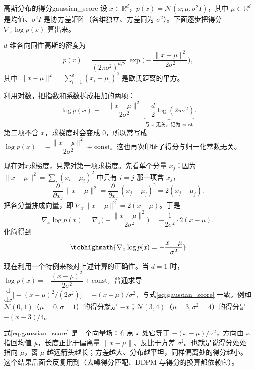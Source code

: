 \begin{example}{高斯分布的得分}{gaussian_score}
设 $x\in\mathbb{R}^d$，$p(x) = \mathcal{N}(x; \mu, \sigma^2 I)$，其中 $\mu\in\mathbb{R}^d$ 是均值、$\sigma^2 I$ 是协方差矩阵（各维独立、方差同为 $\sigma^2$）。下面逐步把得分 $\nabla_x\log p(x)$ 算出来。

$d$ 维各向同性高斯的密度为
\begin{equation}
p(x) = \frac{1}{(2\pi\sigma^2)^{d/2}}\,\exp\!\Big(-\frac{\|x-\mu\|^2}{2\sigma^2}\Big),
\end{equation}
其中 $\|x-\mu\|^2 = \sum_{i=1}^d (x_i-\mu_i)^2$ 是欧氏距离的平方。

利用对数，把指数和系数拆成相加的两项：
\begin{equation}
\log p(x) = -\frac{\|x-\mu\|^2}{2\sigma^2} \;\underbrace{-\;\frac{d}{2}\log(2\pi\sigma^2)}_{\text{与 }x\text{ 无关，记为 const}}.
\end{equation}
第二项不含 $x$，求梯度时会变成 $0$，所以常写成 $\log p(x) = -\dfrac{\|x-\mu\|^2}{2\sigma^2} + \text{const}$。这也再次印证了得分与归一化常数无关。

现在对$x$求梯度，只需对第一项求梯度。先看单个分量 $x_j$：因为 $\|x-\mu\|^2=\sum_i (x_i-\mu_i)^2$ 中只有 $i=j$ 那一项含 $x_j$，
\begin{equation}
\frac{\partial}{\partial x_j}\,\|x-\mu\|^2 = \frac{\partial}{\partial x_j}\,(x_j-\mu_j)^2 = 2(x_j-\mu_j).
\end{equation}
把各分量拼成向量，即 $\nabla_x\|x-\mu\|^2 = 2(x-\mu)$。于是
\begin{equation}
\nabla_x\log p(x) = \nabla_x\Big(-\frac{\|x-\mu\|^2}{2\sigma^2}\Big) = -\frac{1}{2\sigma^2}\cdot 2(x-\mu),
\end{equation}
化简得到
\begin{equation}\label{eq:gaussian_score}
\tcbhighmath{\nabla_x \log p(x) = -\frac{x - \mu}{\sigma^2}}
\end{equation}

现在利用一个特例来核对上述计算的正确性。当 $d=1$ 时，$\log p(x)=-\dfrac{(x-\mu)^2}{2\sigma^2}+\text{const}$，普通求导 $\dfrac{\mathrm d}{\mathrm dx}\big[-(x-\mu)^2/(2\sigma^2)\big]=-(x-\mu)/\sigma^2$，与式\eqref{eq:gaussian_score} 一致。例如 $\mathcal N(0,1)$（$\mu=0,\sigma=1$）的得分就是 $-x$；$\mathcal N(3,4)$（$\mu=3,\sigma^2=4$）的得分是 $-(x-3)/4$。

式\eqref{eq:gaussian_score} 是一个向量场：在点 $x$ 处它等于 $-(x-\mu)/\sigma^2$，方向由 $x$ 指回均值 $\mu$，长度正比于偏离量 $\|x-\mu\|$、反比于方差 $\sigma^2$。也就是说得分处处指向 $\mu$，离 $\mu$ 越远箭头越长；方差越大、分布越平坦，同样偏离处的得分越小。这个结果后面会反复用到（去噪得分匹配、DDPM 与得分的换算都依赖它）。

\end{example}

